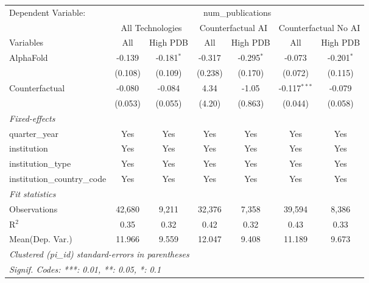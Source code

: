 \begingroup
\centering
\begin{tabular}{lcccccc}
   \tabularnewline \midrule \midrule
   Dependent Variable: & \multicolumn{6}{c}{num\_publications}\\
 & \multicolumn{2}{c}{All Technologies} & \multicolumn{2}{c}{Counterfactual AI} & \multicolumn{2}{c}{Counterfactual No AI} \\
\cmidrule(lr){1-1}\cmidrule(lr){2-3} \cmidrule(lr){4-5} \cmidrule(lr){6-7}
Variables & \multicolumn{1}{c}{All} & \multicolumn{1}{c}{High PDB} & \multicolumn{1}{c}{All} & \multicolumn{1}{c}{High PDB} & \multicolumn{1}{c}{All} & \multicolumn{1}{c}{High PDB} \\
\cmidrule(lr){1-1}\cmidrule(lr){2-2} \cmidrule(lr){3-3} \cmidrule(lr){4-4} \cmidrule(lr){5-5} \cmidrule(lr){6-6} \cmidrule(lr){7-7}
   AlphaFold                    & -0.139  & -0.181$^{*}$ & -0.317  & -0.295$^{*}$ & -0.073         & -0.201$^{*}$\\   
                                & (0.108) & (0.109)      & (0.238) & (0.170)      & (0.072)        & (0.115)\\   
   Counterfactual               & -0.080  & -0.084       & 4.34    & -1.05        & -0.117$^{***}$ & -0.079\\   
                                & (0.053) & (0.055)      & (4.20)  & (0.863)      & (0.044)        & (0.058)\\   
   \midrule
   \emph{Fixed-effects}\\
   quarter\_year                & Yes     & Yes          & Yes     & Yes          & Yes            & Yes\\  
   institution                  & Yes     & Yes          & Yes     & Yes          & Yes            & Yes\\  
   institution\_type            & Yes     & Yes          & Yes     & Yes          & Yes            & Yes\\  
   institution\_country\_code   & Yes     & Yes          & Yes     & Yes          & Yes            & Yes\\  
   \midrule
   \emph{Fit statistics}\\
   Observations                 & 42,680  & 9,211        & 32,376  & 7,358        & 39,594         & 8,386\\  
   R$^2$                        & 0.35    & 0.32         & 0.42    & 0.32         & 0.43           & 0.33\\  
Mean(Dep. Var.) & 11.966 & 9.559 & 12.047 & 9.408 & 11.189 & 9.673 \\
   \midrule \midrule
   \multicolumn{7}{l}{\emph{Clustered (pi\_id) standard-errors in parentheses}}\\
   \multicolumn{7}{l}{\emph{Signif. Codes: ***: 0.01, **: 0.05, *: 0.1}}\\
\end{tabular}
\par\endgroup
